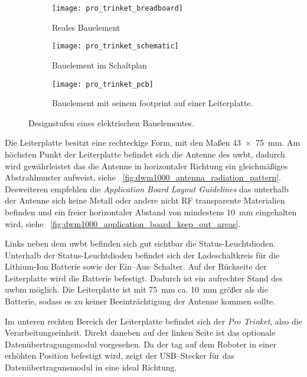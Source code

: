 \begin{figure}
	\begin{subfigure}[t]{0.3\textwidth}
		\centering
		\texttt{[image: pro\_trinket\_breadboard]}
		\caption{Reales Bauelement}
		\label{fig:pro_trinket_breadboard}
	\end{subfigure}
	\quad
	\begin{subfigure}[t]{0.3\textwidth}
		\centering
		\texttt{[image: pro\_trinket\_schematic]}
		\caption{Bauelement im Schaltplan}
		\label{fig:pro_trinket_schematic}
	\end{subfigure}
	\quad
	\begin{subfigure}[t]{0.3\textwidth}
		\centering
		\texttt{[image: pro\_trinket\_pcb]}
		\caption{Bauelement mit seinem \gls{footprint} auf einer Leiterplatte.}
		\label{fig:pro_trinket_pcb}
	\end{subfigure}
	\caption{Designstufen eines elektrischen Bauelementes.}
	\label{fig:breadboard_schematic_pcb}
\end{figure}

Die Leiterplatte besitzt eine rechteckige Form, mit den Maßen \SI{43 x 75}{\mm}. Am höchsten Punkt der Leiterplatte befindet sich die Antenne des \gls{uwbt}, dadurch wird gewährleistet das die Antenne in horizontaler Richtung ein gleichmäßiges Abstrahlmuster aufweist, siehe \figurename~\ref{fig:dwm1000_antenna_radiation_pattern}. Desweiteren empfehlen die \textit{Application Board Layout Guidelines} das unterhalb der Antenne sich keine Metall oder andere nicht RF transparente Materialien befinden und ein freier horizontaler Abstand von mindestens \SI{10}{\mm} eingehalten wird, siehe \figurename~\ref{fig:dwm1000_application_board_keep_out_areas}.

Links neben dem \gls{uwbt} befinden sich gut sichtbar die Status-Leuchtdioden. Unterhalb der Status-Leuchtdioden befindet sich der Ladeschaltkreis für die Lithium-Ion Batterie sowie der Ein--Aus--Schalter. Auf der Rückseite der Leiterplatte wird die Batterie befestigt. Dadurch ist ein aufrechter Stand des \gls{uwbm} möglich. Die Leiterplatte ist mit \SI{75}{\mm} ca. \SI{10}{\mm} größer als die Batterie, sodass es zu keiner Beeinträchtigung der Antenne kommen sollte.

Im unteren rechten Bereich der Leiterplatte befindet sich der \textit{Pro Trinket}, also die Verarbeitungseinheit. Direkt daneben auf der linken Seite ist das optionale Datenübertragungsmodul vorgesehen. Da der \gls{tag} auf dem Roboter in einer erhöhten Position befestigt wird, zeigt der USB--Stecker für das Datenübertragunsmodul in eine ideal Richtung.

